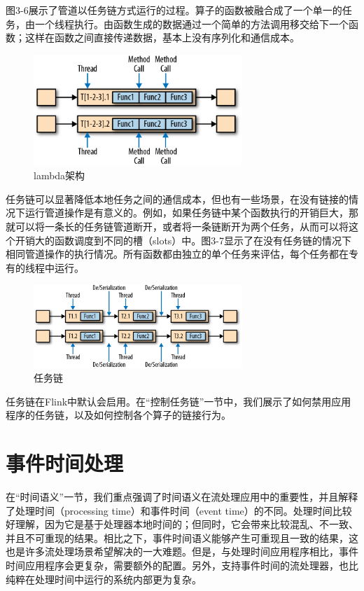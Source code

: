 \documentclass[cn,11pt,chinese]{elegantbook}
\begin{document}
图3-6展示了管道以任务链方式运行的过程。算子的函数被融合成了一个单一的任务，由一个线程执行。由函数生成的数据通过一个简单的方法调用移交给下一个函数；这样在函数之间直接传递数据，基本上没有序列化和通信成本。

\begin{figure}[htbp]
    \centering
    \includegraphics[width=0.7\textwidth]{images/spaf_0306.png}
    \caption{lambda架构}
\end{figure}

任务链可以显著降低本地任务之间的通信成本，但也有一些场景，在没有链接的情况下运行管道操作是有意义的。例如，如果任务链中某个函数执行的开销巨大，那就可以将一条长的任务链管道断开，或者将一条链断开为两个任务，从而可以将这个开销大的函数调度到不同的槽（slots）中。图3-7显示了在没有任务链的情况下相同管道操作的执行情况。所有函数都由独立的单个任务来评估，每个任务都在专有的线程中运行。

\begin{figure}[htbp]
    \centering
    \includegraphics[width=0.7\textwidth]{images/spaf_0307.png}
    \caption{任务链}
\end{figure}

任务链在Flink中默认会启用。在“控制任务链”一节中，我们展示了如何禁用应用程序的任务链，以及如何控制各个算子的链接行为。

\section{事件时间处理}

在“时间语义”一节，我们重点强调了时间语义在流处理应用中的重要性，并且解释了处理时间（processing time）和事件时间（event time）的不同。处理时间比较好理解，因为它是基于处理器本地时间的；但同时，它会带来比较混乱、不一致、并且不可重现的结果。相比之下，事件时间语义能够产生可重现且一致的结果，这也是许多流处理场景希望解决的一大难题。但是，与处理时间应用程序相比，事件时间应用程序会更复杂，需要额外的配置。另外，支持事件时间的流处理器，也比纯粹在处理时间中运行的系统内部更为复杂。
\end{document}
